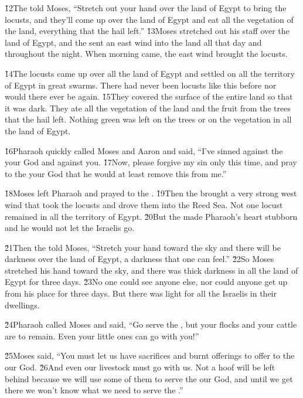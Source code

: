 \v{12}The  told Moses, ``Stretch out your hand over the land of Egypt to bring the locusts, and they'll come up over the land of Egypt and eat all the vegetation of the land, everything that the hail left.'' \v{13}Moses stretched out his staff over the land of Egypt, and the  sent an east wind into the land all that day and throughout the night. When morning came, the east wind brought the locusts.

\v{14}The locusts came up over all the land of Egypt and settled on all the territory of Egypt in great swarms. There had never been locusts like this before nor would there ever be again. \v{15}They covered the surface of the entire land so that it was dark. They ate all the vegetation of the land and the fruit from the trees that the hail left. Nothing green was left on the trees or on the vegetation in all the land of Egypt.

\v{16}Pharaoh quickly called Moses and Aaron and said, ``I've sinned against the  your God and against you. \v{17}Now, please forgive my sin only this time, and pray to the  your God that he would at least remove this from me.''

\v{18}Moses left Pharaoh and prayed to the . \v{19}Then the  brought a very strong west wind that took the locusts and drove them into the Reed Sea. Not one locust remained in all the territory of Egypt. \v{20}But the  made Pharaoh's heart stubborn and he would not let the Israelis go.

\v{21}Then the  told Moses, ``Stretch your hand toward the sky and there will be darkness over the land of Egypt, a darkness that one can feel.'' \v{22}So Moses stretched his hand toward the sky, and there was thick darkness in all the land of Egypt for three days. \v{23}No one could see anyone else, nor could anyone get up from his place for three days. But there was light for all the Israelis in their dwellings.

\v{24}Pharaoh called Moses and said, ``Go serve the , but your flocks and your cattle are to remain. Even your little ones can go with you!''

\v{25}Moses said, ``You must let us have sacrifices and burnt offerings to offer to the  our God. \v{26}And even our livestock must go with us. Not a hoof will be left behind because we will use some of them to serve the  our God, and until we get there we won't know what we need to serve the .''

